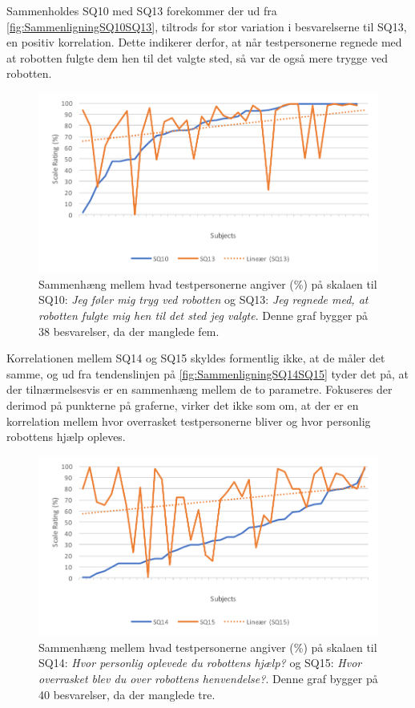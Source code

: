 \noindent
%
Sammenholdes SQ10 med SQ13 forekommer der ud fra \autoref{fig:SammenligningSQ10SQ13}, tiltrods for stor variation i besvarelserne til SQ13, en positiv korrelation. Dette indikerer derfor, at når testpersonerne regnede med at robotten fulgte dem hen til det valgte sted, så var de også mere trygge ved robotten. 
%
\begin{figure}[H]
	\centering
	\includegraphics[width=\textwidth]{Figure/Korrelationsgrafer/SQ10+SQ13}
	\caption{Sammenhæng mellem hvad testpersonerne angiver (\%) på skalaen til SQ10: \textit{Jeg føler mig tryg ved robotten} og SQ13: \textit{Jeg regnede med, at robotten fulgte mig hen til det sted jeg valgte}. Denne graf bygger på 38 besvarelser, da der manglede fem.}
	\label{fig:SammenligningSQ10SQ13}
\end{figure}
\noindent
%
Korrelationen mellem SQ14 og SQ15 skyldes formentlig ikke, at de måler det samme, og ud fra tendenslinjen på \autoref{fig:SammenligningSQ14SQ15} tyder det på, at der tilnærmelsesvis er en sammenhæng mellem de to parametre. Fokuseres der derimod på punkterne på graferne, virker det ikke som om, at der er en korrelation mellem hvor overrasket testpersonerne bliver og hvor personlig robottens hjælp opleves.
%
\begin{figure}[H]
	\centering
	\includegraphics[width=\textwidth]{Figure/Korrelationsgrafer/SQ14+SQ15}
	\caption{Sammenhæng mellem hvad testpersonerne angiver (\%) på skalaen til SQ14: \textit{Hvor personlig oplevede du robottens hjælp?} og SQ15: \textit{Hvor overrasket blev du over robottens henvendelse?}. Denne graf bygger på 40 besvarelser, da der manglede tre.}
	\label{fig:SammenligningSQ14SQ15}
\end{figure}
